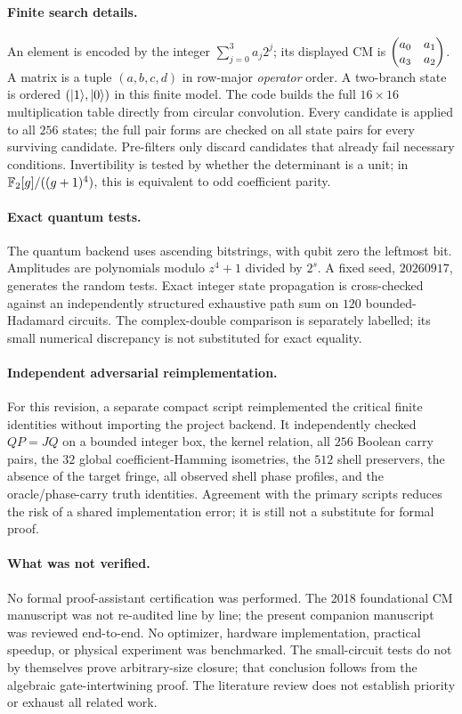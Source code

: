 \paragraph{Finite search details.}
An element is encoded by the integer $\sum_{j=0}^3a_j2^j$; its displayed CM is $\begin{pmatrix}a_0&a_1\\a_3&a_2\end{pmatrix}$. A matrix is a tuple $(a,b,c,d)$ in row-major \emph{operator} order. A two-branch state is ordered $(\lvert 1\rangle,\lvert 0\rangle)$ in this finite model. The code builds the full $16\times16$ multiplication table directly from circular convolution. Every candidate is applied to all $256$ states; the full pair forms are checked on all state pairs for every surviving candidate. Pre-filters only discard candidates that already fail necessary conditions. Invertibility is tested by whether the determinant is a unit; in $\mathbb F_2[g]/((g+1)^4)$, this is equivalent to odd coefficient parity.

\paragraph{Exact quantum tests.}
The quantum backend uses ascending bitstrings, with qubit zero the leftmost bit. Amplitudes are polynomials modulo $z^4+1$ divided by $2^s$. A fixed seed, $20260917$, generates the random tests. Exact integer state propagation is cross-checked against an independently structured exhaustive path sum on $120$ bounded-Hadamard circuits. The complex-double comparison is separately labelled; its small numerical discrepancy is not substituted for exact equality.

\paragraph{Independent adversarial reimplementation.}
For this revision, a separate compact script reimplemented the critical finite identities without importing the project backend.  It independently checked $QP=JQ$ on a bounded integer box, the kernel relation, all $256$ Boolean carry pairs, the $32$ global coefficient-Hamming isometries, the $512$ shell preservers, the absence of the target fringe, all observed shell phase profiles, and the oracle/phase-carry truth identities.  Agreement with the primary scripts reduces the risk of a shared implementation error; it is still not a substitute for formal proof.

\paragraph{What was not verified.}
No formal proof-assistant certification was performed. The 2018 foundational CM manuscript was not re-audited line by line; the present companion manuscript was reviewed end-to-end. No optimizer, hardware implementation, practical speedup, or physical experiment was benchmarked. The small-circuit tests do not by themselves prove arbitrary-size closure; that conclusion follows from the algebraic gate-intertwining proof. The literature review does not establish priority or exhaust all related work.

